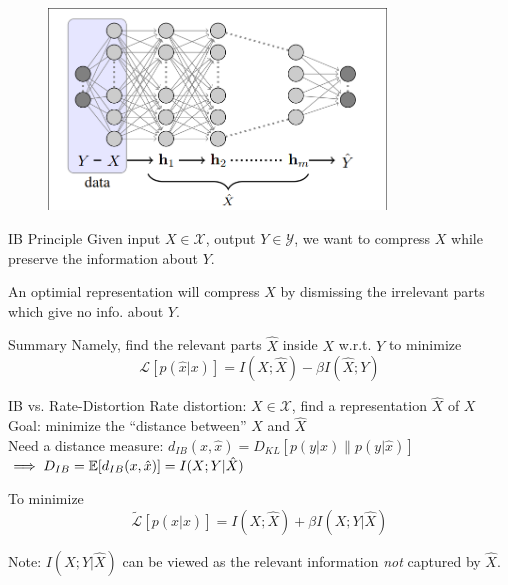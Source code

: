 \documentclass[xcolor={svgnames}]{beamer}
\begin{document}
\begin{frame}
	\begin{figure}[hp]
		\centering
		\includegraphics[width=0.8\textwidth]{figures/dnn.png}
	\end{figure}
\end{frame}
\begin{frame}{IB Principle}
	Given input $X \in \mathcal{X}$, output $Y \in \mathcal{Y}$, we want to compress $X$ while preserve the information about $Y$. 
\pause

	An optimial representation will compress $X$ by dismissing the irrelevant parts which give no info. about $Y$.
\pause
\bigskip	
	\begin{exampleblock}{Summary}
		Namely, find the relevant parts $\hat{X}$ inside $X$ w.r.t. $Y$ to minimize
		\[
			\mathcal{L}[p(\hat{x}|x)] = I\left( X;\hat{X} \right) - \beta I\left( \hat{X};Y \right)
		\]
	\end{exampleblock}
\end{frame}
\begin{frame}{IB vs. Rate-Distortion}
	Rate distortion: $X \in \mathcal{X}$, find a representation $\hat{X}$ of $X$ \\
	Goal: minimize the ``distance between'' $X$ and $\hat{X}$ \\
	\pause
	Need a distance measure: $d_{IB}(x,\hat{x}) = D_{KL}[p(y|x) \| p(y|\hat{x})]$
	$\implies D_{IB} = \mathbb{E}{}[d_{IB}(x,\hat{x})] = I(X;Y|\hat{X})$
	
	\pause
	To minimize
	\[
		\tilde{\mathcal{L}}[p(\hat{x}|x)] = I\left( X;\hat{X} \right) + \beta I\left( X;Y | \hat{X} \right)
	\]

	Note: $I( X;Y | \hat{X} )$ can be viewed as the relevant information \emph{not} captured by $\hat{X}$.
\end{frame}
\end{document}
